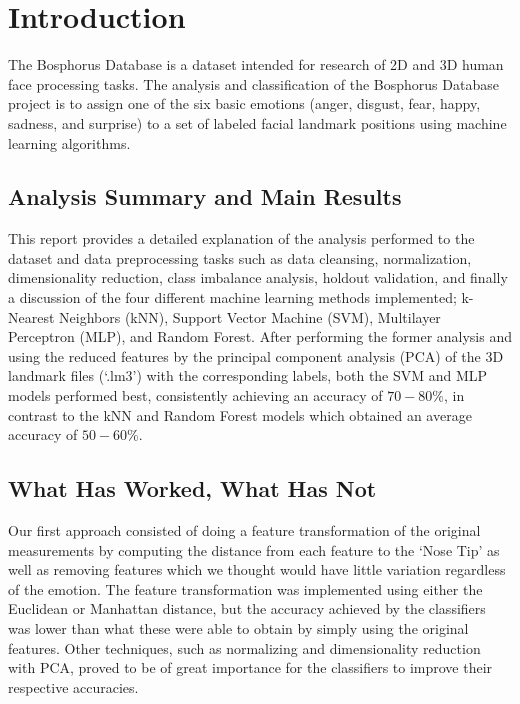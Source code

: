\section{Introduction}

The Bosphorus Database is a dataset intended for research of 2D and 3D human face processing tasks. The analysis and classification of the Bosphorus Database project is to assign one of the six basic emotions (anger, disgust, fear, happy, sadness, and surprise) to a set of labeled facial landmark positions using machine learning algorithms.

\subsection{Analysis Summary and Main Results}
This report provides a detailed explanation of the analysis performed to the dataset and data preprocessing tasks such as data cleansing, normalization, dimensionality reduction, class imbalance analysis, holdout validation, and finally a discussion of the four different machine learning methods implemented; k-Nearest Neighbors (kNN), Support Vector Machine (SVM), Multilayer Perceptron (MLP), and Random Forest. After performing the former analysis and using the reduced features by the principal component analysis (PCA) of the 3D landmark files (`.lm3') with the corresponding labels, both the SVM and MLP models performed best, consistently achieving an accuracy of $70-80\%$, in contrast to the kNN and Random Forest models which obtained an average accuracy of $50-60\%$.

\subsection{What Has Worked, What Has Not}
Our first approach consisted of doing a feature transformation of the original measurements by computing the distance from each feature to the `Nose Tip' as well as removing features which we thought would have little variation regardless of the emotion. The feature transformation was implemented using either the Euclidean or Manhattan distance, but the accuracy achieved by the classifiers was lower than what these were able to obtain by simply using the original features. Other techniques, such as normalizing and dimensionality reduction with PCA, proved to be of great importance for the classifiers to improve their respective accuracies.

